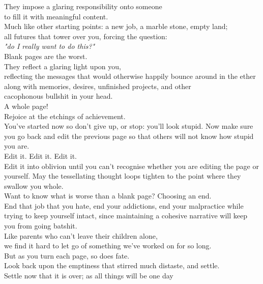 They impose a glaring responsibility onto someone\\
to fill it with meaningful content.\\
Much like other starting points:
a new job, a marble stone, empty land;\\
all futures that tower over you, forcing the question:\\
\emph{"do I really want to do this?"}
\vspace{7pt}\\
Blank pages are the worst.\\
They reflect a glaring light upon you,\\reflecting the messages that would otherwise happily bounce around in the ether along with memories, desires, unfinished projects, and other\\
cacophonous bullshit in your head.
\vspace{7pt}\\
A whole page!\\
Rejoice at the etchings of achievement.\\You've started now so don't give up, or stop: you'll look stupid. Now make sure you go back and edit the previous page so that others will not know how stupid you are.
\vspace{7pt}\\
Edit it. Edit it. Edit it.\\
Edit it into oblivion until you can't recognise whether you are editing the page or yourself. May the tessellating thought loops tighten to the point where they swallow you whole.
\vspace{7pt}\\
Want to know what is worse than a blank page?
Choosing an end.\\End that job that you hate, end your addictions, end your malpractice while trying to keep yourself intact, since maintaining a cohesive narrative will keep you from going batshit.
\vspace{7pt}\\
Like parents who can't leave their children alone,\\ we find it hard to let go of something we've worked on for so long.\\
But as you turn each page, so does fate.\\Look back upon the emptiness that stirred much distaste,
and settle.\\
Settle now that it is over; as all things will be one day
\clearpage

